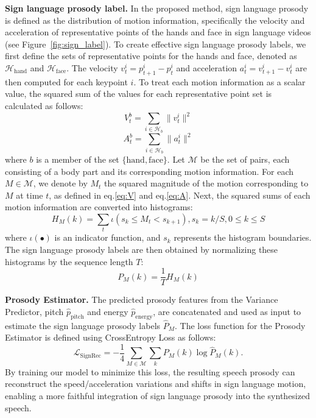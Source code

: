 \noindent
{\textbf{Sign language prosody label.}} In the proposed method, sign language prosody is defined as the distribution of motion information, specifically the velocity and acceleration of representative points of the hands and face in sign language videos (see Figure~\ref{fig:sign_label}).
To create effective sign language prosody labels, we first define the sets of representative points for the hands and face, denoted as $\mathcal{H}_{\mathrm{hand}}$ and $\mathcal{H}_{\mathrm{face}}$. The velocity $v^i_t=p^i_{t+1}-p^i_t$ and acceleration $a^i_t=v^i_{t+1}-v^i_t$ are then computed for each keypoint $i$. To treat each motion information as a scalar value, the squared sum of the values for each representative point set is calculated as follows:
\begin{equation}\label{eq:V}
V^b_t=\sum_{i\in\mathcal{H}_{b}}\|v^i_t\|^2
\end{equation}
\begin{equation}\label{eq:A}
A^b_t=\sum_{i\in\mathcal{H}_{b}}\|a^i_t\|^2
\end{equation}
where $b$ is a member of the set $\{\mathrm{hand}, \mathrm{face}\}$. Let $\mathcal{M}$ be the set of pairs, each consisting of a body part and its corresponding motion information. For each $M \in \mathcal{M}$, we denote by $M_t$ the squared magnitude of the motion corresponding to $M$ at time $t$, as defined in eq.\ref{eq:V} and eq.\ref{eq:A}.
Next, the squared sums of each motion information are converted into histograms:
\begin{equation}
H_{M}(k)=\sum_{t}\iota(s_k\le M_t <s_{k+1}), s_k=k/S, 0 \le k \le S
\end{equation}
where $\iota(\bullet)$ is an indicator function, and $s_k$ represents the histogram boundaries. The sign language prosody labels are then obtained by normalizing these histograms by the sequence length $T$:
\begin{equation}
P_{M}(k)=\frac{1}{T}H_{M}(k)
\end{equation}

\noindent
{\textbf{Prosody Estimator.}}
The predicted prosody features from the Variance Predictor, pitch $\hat{p}_{\mathrm{pitch}}$ and energy $\hat{p}_{\mathrm{energy}}$, are concatenated and used as input to estimate the sign language prosody labels $\hat{P}_{M}$. The loss function for the Prosody Estimator is defined using CrossEntropy Loss as follows:
\begin{equation}\label{eq:sign_rec}
\mathcal{L}_{\mathrm{SignRec}}=-\frac{1}{4}\sum_{M \in \mathcal{M}}\sum_{k}P_{M}(k)\log\hat{P}_{M}(k).
\end{equation}
By training our model to minimize this loss, the resulting speech prosody can reconstruct 
the speed/acceleration variations and shifts in sign language motion, enabling a more faithful integration 
of sign language prosody into the synthesized speech.


